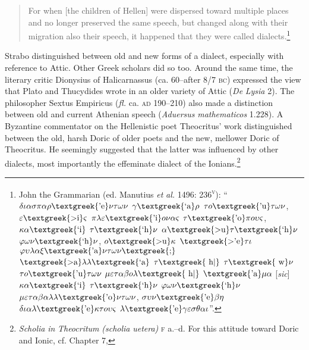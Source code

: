 \documentclass[output=paper]{langsci/langscibook}
\begin{document}
\begin{quote}
For when [the children of Hellen] were dispersed toward multiple places and no longer preserved the same speech, but changed along with their migration also their speech, it happened that they were called dialects.\footnote{John the Grammarian (ed. Manutius \textit{et} \textit{al.} 1496: 236\textsc{\textsuperscript{v}}): “$\delta \iota \alpha \sigma \pi \alpha \rho \text{\textgreek{'e}}\nu \tau \omega \nu $ $\gamma \text{\textgreek{`a}}\rho $ $\tau o\text{\textgreek{'u}}\tau \omega \nu $, $\varepsilon \text{\textgreek{>i}}\varsigma $ $\pi \lambda \varepsilon \text{\textgreek{'i}}o\nu \alpha \varsigma $ $\tau \text{\textgreek{'o}}\pi o\upsilon \varsigma $, $\kappa \alpha \text{\textgreek{`i}}$ $\tau \text{\textgreek{`h}}\nu $ $\alpha \text{\textgreek{>u}}\tau \text{\textgreek{`h}}\nu $ $\varphi \omega \nu \text{\textgreek{`h}}\nu $, $o\text{\textgreek{>u}}\kappa $ $\text{\textgreek{>'e}}\tau \iota $ $\varphi \upsilon \lambda \alpha \xi \text{\textgreek{'a}}\nu \tau \omega \nu \text{\textgreek{;}}$ $\text{\textgreek{>a}}\lambda \lambda \text{\textgreek{`a}}$ $\tau \text{\textgreek{~h|}}$ $\tau \text{\textgreek{~w}}\nu $ $\tau o\text{\textgreek{'u}}\tau \omega \nu $ $\mu \varepsilon \tau \alpha \beta o\lambda \text{\textgreek{~h|}}$ $\text{\textgreek{'a}}\mu \alpha $ [\textit{sic}] $\kappa \alpha \text{\textgreek{`i}}$ $\tau \text{\textgreek{`h}}\nu $ $\varphi \omega \nu \text{\textgreek{`h}}\nu $ $\mu \varepsilon \tau \alpha \beta \alpha \lambda \lambda \text{\textgreek{'o}}\nu \tau \omega \nu $, $\sigma \upsilon \nu \text{\textgreek{'e}}\beta \eta $ $\delta \iota \alpha \lambda \text{\textgreek{'e}}\kappa \tau o\upsilon \varsigma $ $\lambda \text{\textgreek{'e}}\gamma \varepsilon \sigma \theta \alpha \iota $”.}
\end{quote}

Strabo distinguished between old and new forms of a dialect, especially with reference to Attic. Other Greek scholars did so too. Around the same time, the literary critic Dionysius of Halicarnassus (ca. 60–after 8/7 \textsc{bc}) expressed the view that Plato and Thucydides wrote in an older variety of Attic (\textit{De} \textit{Lysia} 2). The philosopher Sextus Empiricus (\textit{fl.} ca. \textsc{ad} 190–210) also made a distinction between old and current Athenian speech (\textit{Aduersus} \textit{mathematicos} 1.228). A Byzantine commentator on the Hellenistic poet Theocritus’ work distinguished between the old, harsh Doric of older poets and the new, mellower Doric of Theocritus. He seemingly suggested that the latter was influenced by other dialects, most importantly the effeminate dialect of the Ionians.\footnote{\textit{Scholia} \textit{in} \textit{Theocritum} \textit{(scholia} \textit{uetera)} \textsc{f} a.–d. For this attitude toward Doric and Ionic, cf. Chapter 7, }
\end{document}
